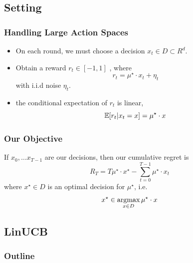 \documentclass[aspectratio=169]{beamer}
\begin{document}
\subsection{Setting}

\begin{frame}\frametitle{Handling Large Action Spaces}

\begin{itemize}
\item On each round, we must \alert{choose a decision $x_t \in D\subset R^d$}. 
\item \pause Obtain a reward $r_t \in [-1, 1]$ , where
\[
r_t =  \mu^\star \cdot x_t + \eta_t
\]
with i.i.d noise $\eta_t$.
\item \pause the conditional expectation of $r_t$ is linear,
\alert{\[
\mathbb{E}[r_t|x_t=x] = \mu^\star \cdot x 
\]}
\end{itemize}
\end{frame}

\begin{frame}\frametitle{Our Objective}

If $x_0, \ldots x_{T-1}$ are our decisions, then 
our \alert{cumulative regret} is
\[
R_T = T \mu^\star\cdot x^\star - \sum_{t=0}^{T-1} \mu^\star\cdot x_t
\]
where $x^\star \in D$ is an optimal decision for $\mu^\star$, i.e.
\[
x^\star \in \operatorname*{argmax}_{x\in D} \mu^\star \cdot x
\]
\end{frame}


\subsection{LinUCB}

\begin{frame}[noframenumbering]
  \frametitle{Outline}
  \tableofcontents[currentsubsection]
\end{frame}
\end{document}
